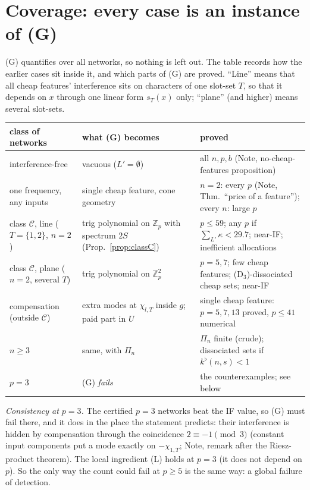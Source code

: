 \documentclass[11pt]{article}
\theoremstyle{definition}
\begin{document}
\section{Coverage: every case is an instance of (G)}
(G) quantifies over all networks, so nothing is left out.  The table records how the earlier cases sit inside it, and which parts
of (G) are proved.  ``Line'' means that all cheap features' interference sits on characters of one slot-set $T$, so that it depends on
$x$ through one linear form $s_T(x)$ only; ``plane'' (and higher) means several slot-sets.
\begin{center}
\small
\begin{tabular}{p{}p{}p{}}
\toprule
class of networks & what (G) becomes & proved\\
\midrule
interference-free & vacuous ($L'=\emptyset$) & all $n,p,b$ (Note, no-cheap-features proposition)\\
one frequency, any inputs & single cheap feature, cone geometry & $n=2$: every $p$ (Note, Thm.\ ``price of a feature''); every $n$: large $p$\\
class $\mathcal C$, line ($T=\{1,2\}$, $n=2$) & trig polynomial on $\mathbb Z_p$ with spectrum $2S$ (Prop.~\ref{prop:classC}) & $p\le59$; any $p$ if $\sum_{L'}\kappa<29.7$; near-IF; inefficient allocations\\
class $\mathcal C$, plane ($n=2$, several $T$) & trig polynomial on $\mathbb Z_p^2$ & $p=5,7$; few cheap features; (D$_3$)-dissociated cheap sets; near-IF\\
compensation (outside $\mathcal C$) & extra modes at $\chi_{l,T}$ inside $g$; paid part in $U$ & single cheap feature: $p=5,7,13$ proved, $p\le41$ numerical\\
$n\ge3$ & same, with $\Pi_n$ & $\Pi_n$ finite (crude); dissociated sets if $k^\flat(n,s)<1$\\
$p=3$ & (G) \emph{fails} & the counterexamples; see below\\
\bottomrule
\end{tabular}
\end{center}
\emph{Consistency at $p=3$.}  The certified $p=3$ networks beat the IF value, so (G) must fail there, and it does in the place the
statement predicts: their interference is hidden by compensation through the coincidence $2\equiv-1\pmod3$ (constant input
components put a mode exactly on $-\chi_{1,T}$; Note, remark after the Riesz-product theorem).  The local ingredient (L) holds at
$p=3$ (it does not depend on $p$).  So the only way the count could fail at $p\ge5$ is the same way: a global failure of detection.
\end{document}
